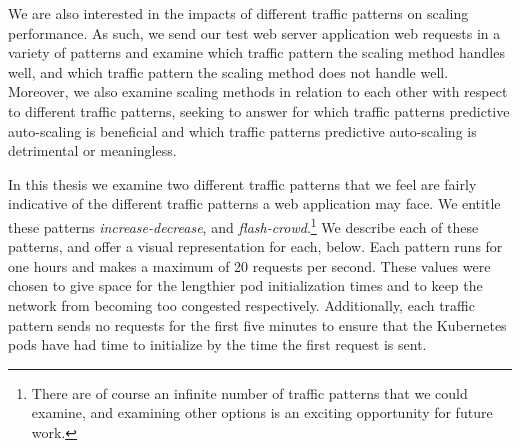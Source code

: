 We are also interested in the impacts of different traffic patterns on scaling
performance. As such, we send our test web server application web requests in a
variety of patterns and examine which traffic pattern the scaling method handles
well, and which traffic pattern the scaling method does not handle well.
Moreover, we also examine scaling methods in relation to each other with respect
to different traffic patterns, seeking to answer for which traffic patterns
predictive auto-scaling is beneficial and which traffic patterns predictive
auto-scaling is detrimental or meaningless.

In this thesis we examine two different traffic patterns that we feel are
fairly indicative of the different traffic patterns a web application may face.
We entitle these patterns \textit{increase-decrease}, and
\textit{flash-crowd}.\footnote{There are of course an infinite number of traffic
patterns that we could examine, and examining other options is an exciting
opportunity for future work.} We describe each of these patterns, and offer a
visual representation for each, below. Each pattern runs for one hours and makes
a maximum of 20 requests per second. These values were chosen to give
space for the lengthier pod initialization times and to keep the network from
becoming too congested respectively. Additionally, each traffic pattern sends no
requests for the first five minutes to ensure that the Kubernetes pods have had
time to initialize by the time the first request is sent.

